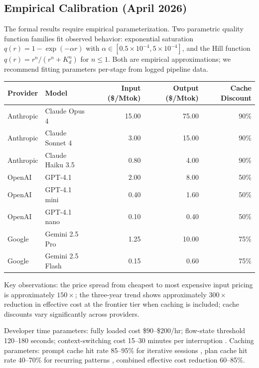 \documentclass[11pt, a4paper]{googledeepmind}
\begin{document}
\subsection{Empirical Calibration (April 2026)}

The formal results require empirical parameterization. Two parametric quality function families fit observed behavior: exponential saturation $q(r) = 1 - \exp(-\alpha r)$ with $\alpha \in [0.5 \times 10^{-4}, 5 \times 10^{-4}]$, and the Hill function $q(r) = r^n / (r^n + K_d^n)$ for $n \leq 1$. Both are empirical approximations; we recommend fitting parameters per-stage from logged pipeline data.

\begin{center}
\small
\begin{tabular}{llrrr}
\toprule
\textbf{Provider} & \textbf{Model} & \textbf{Input (\$/Mtok)} & \textbf{Output (\$/Mtok)} & \textbf{Cache Discount} \\
\midrule
Anthropic & Claude Opus 4 & 15.00 & 75.00 & 90\% \\
Anthropic & Claude Sonnet 4 & 3.00 & 15.00 & 90\% \\
Anthropic & Claude Haiku 3.5 & 0.80 & 4.00 & 90\% \\
\hdashline
OpenAI & GPT-4.1 & 2.00 & 8.00 & 50\% \\
OpenAI & GPT-4.1 mini & 0.40 & 1.60 & 50\% \\
OpenAI & GPT-4.1 nano & 0.10 & 0.40 & 50\% \\
\hdashline
Google & Gemini 2.5 Pro & 1.25 & 10.00 & 75\% \\
Google & Gemini 2.5 Flash & 0.15 & 0.60 & 75\% \\
\bottomrule
\end{tabular}
\end{center}

Key observations: the price spread from cheapest to most expensive input pricing is approximately $150\times$; the three-year trend shows approximately $300\times$ reduction in effective cost at the frontier tier when caching is included; cache discounts vary significantly across providers.

Developer time parameters: fully loaded cost \$90--\$200/hr; flow-state threshold 120--180 seconds; context-switching cost 15--30 minutes per interruption \citep{mark2008interrupted}. Caching parameters: prompt cache hit rate 85--95\% for iterative sessions \citep{anthropic2026coding}, plan cache hit rate 40--70\% for recurring patterns \citep{zhang2025plancache}, combined effective cost reduction 60--85\%.
\end{document}
